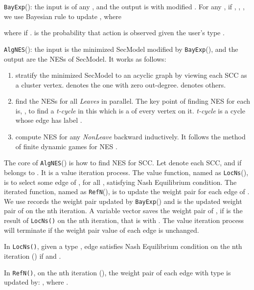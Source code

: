 \documentclass[10pt, conference, compsocconf]{IEEEtran}
\begin{document}
\verb"BayExp"():
the input is  of any , and the output is  with modified .
For any , if , , , we use Bayesian rule to update , where

where  if  .  is the probability that action  is observed given the user's type .

\verb"AlgNES"():
the input is the minimized SecModel modified by \verb"BayExp"(), and the output are the NESs of SecModel. It works as follows:
\begin{enumerate}[1]
\item stratify the minimized SecModel to an acyclic graph by viewing each SCC as a cluster vertex.  denotes the one with zero out-degree.  denotes others.
\item find the NESs for all \textit{Leaves} in parallel. The key point of finding NES for each  is, , to find a \textit{t-cycle} in this  which is a  of every vertex on it. \textit{t-cycle} is a cycle whose edge  has label .
\item compute NES for any \textit{NonLeave} backward inductively. It follows the method of finite dynamic games for NES \cite{martin}.
\end{enumerate}

The core of \verb"AlgNES"() is how to find NES for SCC. Let  denote each SCC, and  if  belongs to . It is a value iteration process.
The value function, named as \verb"LocNs"(), is to select some edge  of , for all , satisfying Nash Equilibrium condition.
The iterated function, named as \verb"RefN"(), is to update the weight pair for each edge of .
We use  records the weight pair updated by \verb"BayExp"() and  is the updated weight pair of  on the nth iteration. A variable vector  saves the weight pair of , if  is the result of \verb"LocNs()" on the nth iteration, that is  with .
The value iteration process will terminate if the weight pair value of each edge is unchanged.

In \verb"LocNs()", given a type , edge  satisfies Nash Equilibrium condition on the nth iteration () if  and .

In \verb"RefN()", on the nth iteration (), the weight pair of each edge  with type  is updated by:
, where .
\end{document}
